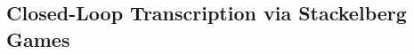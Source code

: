 \documentclass[\toplevelprefix/book-main.tex]{subfiles}
\begin{document}

\subsection{Closed-Loop Transcription via Stackelberg Games}\label{sec:closed-loop-transcription}


\end{document}
